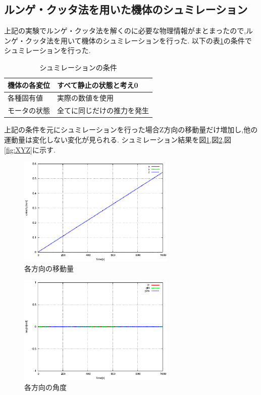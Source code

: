 \documentclass[12pt,oneside]{sotsuken_paper}
\begin{document}
\subsection{ルンゲ・クッタ法を用いた機体のシュミレーション}
上記の実験でルンゲ・クッタ法を解くのに必要な物理情報がまとまったので,ルンゲ・クッタ法を用いて機体のシュミレーションを行った.
以下の表\ref{table:syumi}の条件でシュミレーションを行った.

\begin{table}[htbp]
	\begin{center}
		\caption{シュミレーションの条件}
		\begin{tabular}{|l|l|} \hline
			機体の各変位 & すべて静止の状態と考え0 \\ \hline 
			各種固有値 & 実際の数値を使用 \\ \hline
			モータの状態 & 全てに同じだけの推力を発生 \\ \hline
		\end{tabular}
		\label{table:syumi}
	\end{center}
\end{table}

上記の条件を元にシュミレーションを行った場合Z方向の移動量だけ増加し,他の運動量は変化しない変化が見られる.
シュミレーション結果を図\ref{fig:UVW},図\ref{fig:tpy},図\ref{fig:XYZ}に示す.

\begin{figure}[htbp]
	\begin{center}
		\includegraphics[width=75mm]{image/UVW.eps}
		\caption{各方向の移動量}
		\label{fig:UVW}
	\end{center}
\end{figure}

\begin{figure}[htbp]
	\begin{center}
		\includegraphics[width=75mm]{image/tpy.eps}
		\caption{各方向の角度}
		\label{fig:tpy}
	\end{center}
\end{figure}
\end{document}
